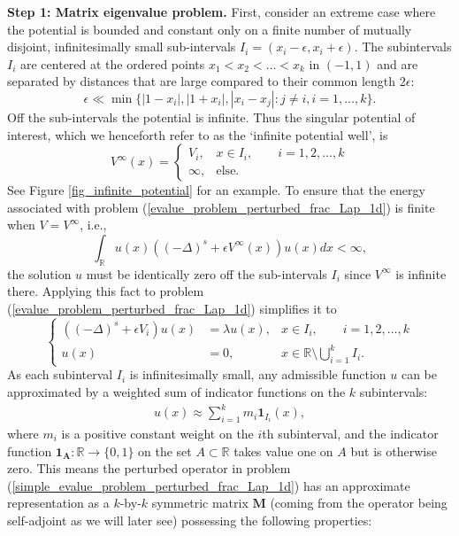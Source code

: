 \documentclass[preprint,12pt]{elsarticle}
\newcommand{\R}{\mathbb R}
\newcommand{\M}{\mathbf{M}}
\begin{document}
\textbf{Step 1: Matrix eigenvalue problem.} First, consider an extreme case where the potential is bounded and constant only on a finite number of mutually disjoint, infinitesimally small sub-intervals $I_i=(x_i-\epsilon,x_i+\epsilon)$. 
The subintervals $I_i$ are centered at the ordered points $x_1<x_2<\ldots<x_k$ in $(-1,1)$ and are separated by distances that are large compared to their common length $2\epsilon$:
\[
\epsilon\ll \min\{|1-x_i|,|1+x_i|,|x_i-x_j|:j\neq i,i=1,\ldots,k\}.
\]
Off the sub-intervals the potential is infinite. Thus the singular potential of interest, which we henceforth refer to as the `infinite potential well', is %
\begin{equation}\label{potential_infinite}
V^{\infty}(x)=\left\{
\begin{array}{ll}
V_i, &x\in I_i,\qquad i=1,2,\ldots, k\\
\infty, &\mbox{else}.
\end{array}\right.
\end{equation}
See Figure \ref{fig_infinite_potential} for an example. To ensure that the energy associated with problem (\ref{evalue_problem_perturbed_frac_Lap_1d}) is finite when $V=V^\infty$, i.e.,
\[
\int_{\R}u(x)\left((-\Delta)^s+\epsilon V^\infty(x)\right)u(x)dx<\infty,
\]
the solution $u$ must be identically zero off the sub-intervals $I_i$ since $V^\infty$ is infinite there. Applying this fact to problem (\ref{evalue_problem_perturbed_frac_Lap_1d}) simplifies it to
\begin{equation}\label{simple_evalue_problem_perturbed_frac_Lap_1d}
 \left\{\begin{aligned}
        ((-\Delta)^s+\epsilon V_i)u(x)&=\lambda u(x), &x\in I_i,\qquad i=1,2,\ldots,k\\
        u(x)&=0, &x\in \R\setminus \bigcup_{i=1}^k I_i.
       \end{aligned}
 \right.
\end{equation}
As each subinterval $I_i$ is infinitesimally small, any admissible function $u$ can be approximated by a weighted sum of indicator functions on the $k$ subintervals:
\begin{align}\label{eigenvector_approximation}
    u(x)\approx \sum_{i=1}^k m_i\mathbf{1}_{I_i}(x),
\end{align}
where $m_i$ is a positive constant weight on the $i$th subinterval, and the indicator function $\mathbf{1_{A}}:\R\to\{0,1\}$ on the set $A\subset\R$ takes value one on $A$ but is otherwise zero. This means the perturbed operator in problem (\ref{simple_evalue_problem_perturbed_frac_Lap_1d}) has an approximate representation as a $k$-by-$k$ symmetric matrix $\M$ (coming from the operator being self-adjoint as we will later see) possessing the following properties: 
\end{document}
